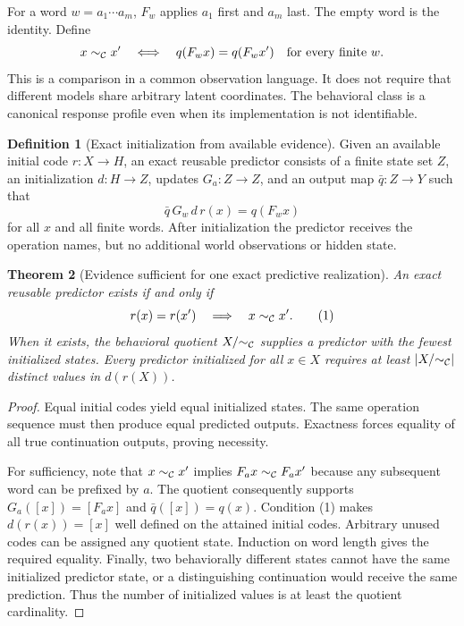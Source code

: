 \documentclass[11pt,letterpaper]{article}
\theoremstyle{plain}
\newtheorem{theorem}{Theorem}[section]
\theoremstyle{definition}
\newtheorem{definition}[theorem]{Definition}
\begin{document}
For a word $w=a_1\cdots a_m$, $F_w$ applies $a_1$ first and $a_m$ last. The empty word is the identity. Define
\[
x\sim_\mathcal C x'\quad\Longleftrightarrow\quad
q(F_wx)=q(F_wx')\quad\text{for every finite }w.
\]
This is a comparison in a common observation language. It does not require that different models share arbitrary latent coordinates. The behavioral class is a canonical response profile even when its implementation is not identifiable.

\begin{definition}[Exact initialization from available evidence]\label{def:initialization}
Given an available initial code $r:X\to H$, an exact reusable predictor consists of a finite state set $Z$, an initialization $d:H\to Z$, updates $G_a:Z\to Z$, and an output map $\bar q:Z\to Y$ such that
\[
\bar q\,G_w\,d\,r(x)=q(F_wx)
\]
for all $x$ and all finite words. After initialization the predictor receives the operation names, but no additional world observations or hidden state.
\end{definition}

\begin{theorem}[Evidence sufficient for one exact predictive realization]\label{thm:grounding}
An exact reusable predictor exists if and only if
\[
r(x)=r(x')\quad\Longrightarrow\quad x\sim_\mathcal C x'.\tag{1}
\]
When it exists, the behavioral quotient $X/{\sim_\mathcal C}$ supplies a predictor with the fewest initialized states. Every predictor initialized for all $x\in X$ requires at least $|X/{\sim_\mathcal C}|$ distinct values in $d(r(X))$.
\end{theorem}
\begin{proof}
Equal initial codes yield equal initialized states. The same operation sequence must then produce equal predicted outputs. Exactness forces equality of all true continuation outputs, proving necessity.

For sufficiency, note that $x\sim_\mathcal C x'$ implies $F_ax\sim_\mathcal C F_ax'$ because any subsequent word can be prefixed by $a$. The quotient consequently supports $G_a([x])=[F_ax]$ and $\bar q([x])=q(x)$. Condition (1) makes $d(r(x))=[x]$ well defined on the attained initial codes. Arbitrary unused codes can be assigned any quotient state. Induction on word length gives the required equality. Finally, two behaviorally different states cannot have the same initialized predictor state, or a distinguishing continuation would receive the same prediction. Thus the number of initialized values is at least the quotient cardinality.
\end{proof}
\end{document}
